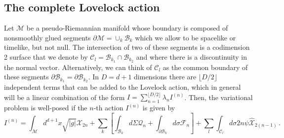 \documentclass[11pt,letterpaper]{article}
\begin{document}
\subsection{The complete Lovelock action}\label{CLove}
Let $\mathcal{M}$ be a pseudo-Riemannian manifold whose boundary is composed of nonsmoothly glued segments $\partial \mathcal{M}=\cup_{k}\mathcal{B}_k$ which we allow to be spacelike or timelike, but not null. The intersection of two of these segments is a codimension 2 surface that we denote by $\mathcal{C}_l=\mathcal{B}_{k_1}\cap \mathcal{B}_{k_2}$ and where there is a discontinuity in the normal vector. Alternatively, we can think of $\mathcal{C}_l$ as the common boundary of these segments $\partial \mathcal{B}_{k_1}=\partial \mathcal{B}_{k_2}$.  In $D=d+1$ dimensions there are $\lfloor D/2\rfloor$ independent terms that can be added to the Lovelock action, which in general will be a linear combination of the form $I=\sum_{n=1}^{\lfloor D/2\rfloor}\lambda_n I^{(n)}$. Then, the variational problem is well-posed if the $n$-th action $I^{(n)}$ is given by
\begin{equation}\label{LoveFull}
I^{(n)}=\int_{\mathcal{M}}d^{d+1}x\sqrt{|g|}\mathcal{X}_{2n}+\sum_{k}\left[\int_{\mathcal{B}_k}d\Sigma \mathcal{Q}_{n}+\int_{\partial\mathcal{B}_k}d\sigma \mathcal{F}_{n}\right]+\sum_l\int_{\mathcal{C}_l}d\sigma 2n\psi \hat{\mathcal{X}}_{2(n-1)}\, .
\end{equation}
\end{document}
